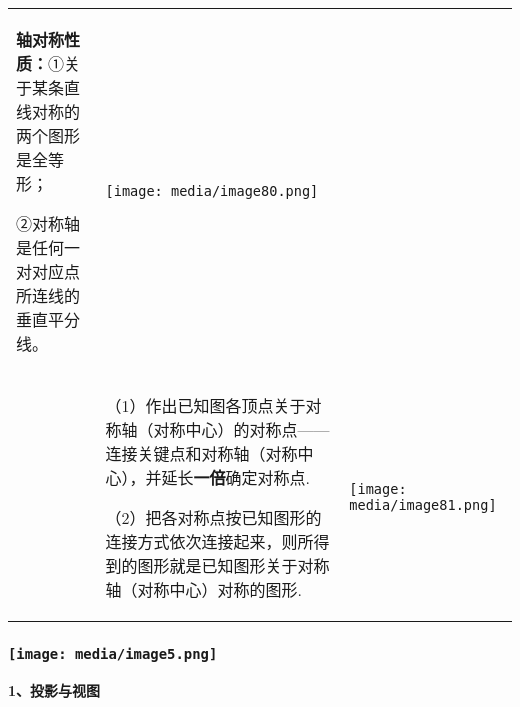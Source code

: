 \documentclass[a4paper,11pt,UTF8]{ctexart}
\begin{document}
\begin{longtable}[]{@{}lll@{}}
\begin{minipage}[t]{0.30\columnwidth}
\textbf{轴对称性质：}①关于某条直线对称的两个图形是全等形；

②对称轴是任何一对对应点所连线的垂直平分线。\strut
\end{minipage} & \begin{minipage}[t]{0.30\columnwidth}\raggedright
\texttt{[image: media/image80.png]}\strut
\end{minipage}\tabularnewline
\begin{minipage}[t]{0.30\columnwidth}\raggedright
\strut
\end{minipage} & \begin{minipage}[t]{0.30\columnwidth}\raggedright
（1）作出已知图各顶点关于对称轴（对称中心）的对称点------连接关键点和对称轴（对称中心），并延长\textbf{一倍}确定对称点.

（2）把各对称点按已知图形的连接方式依次连接起来，则所得到的图形就是已知图形关于对称轴（对称中心）对称的图形.\strut
\end{minipage} & \begin{minipage}[t]{0.30\columnwidth}\raggedright
\texttt{[image: media/image81.png]}\strut
\end{minipage}\tabularnewline
\bottomrule
\end{longtable}

\hypertarget{ux5b66ux79d1ux7f51www.zxxk.com--ux6559ux80b2ux8d44ux6e90ux95e8ux6237ux63d0ux4f9bux8bd5ux9898ux8bd5ux5377ux6559ux6848ux8bfeux4ef6ux6559ux5b66ux8bbaux6587ux7d20ux6750ux7b49ux5404ux7c7bux6559ux5b66ux8d44ux6e90ux5e93ux4e0bux8f7dux8fd8ux6709ux5927ux91cfux4e30ux5bccux7684ux6559ux5b66ux8d44ux8baf-23}{%
\subsubsection{\texorpdfstring{\protect\texttt{[image: media/image5.png]}}{学科网(www.zxxk.com)-\/-教育资源门户，提供试题试卷、教案、课件、教学论文、素材等各类教学资源库下载，还有大量丰富的教学资讯！}}\label{ux5b66ux79d1ux7f51www.zxxk.com--ux6559ux80b2ux8d44ux6e90ux95e8ux6237ux63d0ux4f9bux8bd5ux9898ux8bd5ux5377ux6559ux6848ux8bfeux4ef6ux6559ux5b66ux8bbaux6587ux7d20ux6750ux7b49ux5404ux7c7bux6559ux5b66ux8d44ux6e90ux5e93ux4e0bux8f7dux8fd8ux6709ux5927ux91cfux4e30ux5bccux7684ux6559ux5b66ux8d44ux8baf-23}}

\textbf{1、投影与视图}
\end{document}
